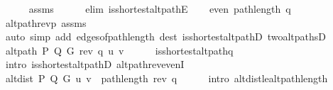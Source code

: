 \begin{isabellebody}
\ \ \ \ \isamarkupfalse%
\ assms{\isacharparenleft}{\kern0pt}{}{\isacharparenright}{\kern0pt}\isanewline
\ \ \ \ \isamarkupfalse%
\ {\isacharparenleft}{\kern0pt}elim\ is{\isacharunderscore}{\kern0pt}shortest{\isacharunderscore}{\kern0pt}alt{\isacharunderscore}{\kern0pt}pathE{\isacharparenright}{\kern0pt}\isanewline
\ \ \isamarkupfalse%
\ {\isachardoublequoteopen}even\ {\isacharparenleft}{\kern0pt}path{\isacharunderscore}{\kern0pt}length\ q{\isacharparenright}{\kern0pt}{\isachardoublequoteclose}\isanewline
\ \ \ \ \isamarkupfalse%
\ alt{\isacharunderscore}{\kern0pt}path{\isacharunderscore}{\kern0pt}rev{\isacharunderscore}{\kern0pt}p\ assms{\isacharparenleft}{\kern0pt}{}{\isacharcomma}{\kern0pt}\ {}{\isacharparenright}{\kern0pt}\isanewline
\ \ \ \ \isamarkupfalse%
\ {\isacharparenleft}{\kern0pt}auto\ simp\ add{\isacharcolon}{\kern0pt}\ edges{\isacharunderscore}{\kern0pt}of{\isacharunderscore}{\kern0pt}path{\isacharunderscore}{\kern0pt}length\ dest{\isacharcolon}{\kern0pt}\ is{\isacharunderscore}{\kern0pt}shortest{\isacharunderscore}{\kern0pt}alt{\isacharunderscore}{\kern0pt}pathD{\isacharparenleft}{\kern0pt}{}{\isacharparenright}{\kern0pt}\ two{\isacharunderscore}{\kern0pt}alt{\isacharunderscore}{\kern0pt}pathsD{\isacharparenright}{\kern0pt}\isanewline
\ \ \isamarkupfalse%
\ {\isachardoublequoteopen}alt{\isacharunderscore}{\kern0pt}path\ P\ Q\ G\ {\isacharparenleft}{\kern0pt}rev\ q{\isacharparenright}{\kern0pt}\ u\ v{\isachardoublequoteclose}\isanewline
\ \ \ \ \isamarkupfalse%
\ is{\isacharunderscore}{\kern0pt}shortest{\isacharunderscore}{\kern0pt}alt{\isacharunderscore}{\kern0pt}path{\isacharunderscore}{\kern0pt}q\isanewline
\ \ \ \ \isamarkupfalse%
\ {\isacharparenleft}{\kern0pt}intro\ is{\isacharunderscore}{\kern0pt}shortest{\isacharunderscore}{\kern0pt}alt{\isacharunderscore}{\kern0pt}pathD{\isacharparenleft}{\kern0pt}{}{\isacharparenright}{\kern0pt}\ alt{\isacharunderscore}{\kern0pt}path{\isacharunderscore}{\kern0pt}rev{\isacharunderscore}{\kern0pt}evenI{\isacharparenright}{\kern0pt}\isanewline
\ \ \isamarkupfalse%
\ {\isachardoublequoteopen}alt{\isacharunderscore}{\kern0pt}dist\ P\ Q\ G\ u\ v\ {\isasymle}\ path{\isacharunderscore}{\kern0pt}length\ {\isacharparenleft}{\kern0pt}rev\ q{\isacharparenright}{\kern0pt}{\isachardoublequoteclose}\isanewline
\ \ \ \ \isamarkupfalse%
\ {\isacharparenleft}{\kern0pt}intro\ alt{\isacharunderscore}{\kern0pt}dist{\isacharunderscore}{\kern0pt}le{\isacharunderscore}{\kern0pt}alt{\isacharunderscore}{\kern0pt}path{\isacharunderscore}{\kern0pt}length{\isacharparenright}{\kern0pt}\isanewline

\end{isabellebody}
